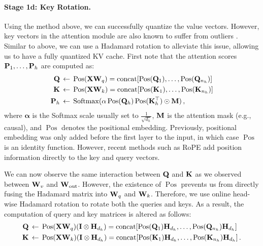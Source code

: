 \paragraph{Stage 1d: Key Rotation.}
Using the method above, we can successfully quantize the value vectors. However, key vectors in the attention module are also known to suffer from outliers \citep{kvquant, kivi}. Similar to above, we can use a Hadamard rotation to alleviate this issue, allowing us to have a fully quantized KV cache. First note that the attention scores ${\mathbf{P}}_1, \ldots, {\mathbf{P}}_h$ are computed as:
\begin{align}
    {\mathbf{Q}} &\,\leftarrow\, \operatorname{Pos}({\mathbf{X}}{\mathbf{W}}_q) = \textrm{concat}[\operatorname{Pos}({\mathbf{Q}}_1), \ldots, \operatorname{Pos}({\mathbf{Q}}_{n_h})] \\
    {\mathbf{K}} &\,\leftarrow\, \operatorname{Pos}({\mathbf{X}}{\mathbf{W}}_k) = \textrm{concat}[\operatorname{Pos}({\mathbf{K}}_1), \ldots, \operatorname{Pos}({\mathbf{K}}_{n_h})]\\
    {\mathbf{P}}_h & \,\leftarrow\, \operatorname{Softmax}(\alpha \operatorname{Pos}({\mathbf{Q}}_h) \operatorname{Pos}({\mathbf{K}}_h^\top) \odot {\mathbf{M}})   \, ,
\end{align}
where $\boldsymbol\alpha$ is the Softmax scale usually set to $\frac{1}{\sqrt{d_h}}$, ${\mathbf{M}}$ is the attention mask (e.g., causal), and $\operatorname{Pos}$ denotes the positional embedding. Previously, positional embedding was only added before the first layer to the input, in which case $\operatorname{Pos}$ is an identity function. However, recent methods such as RoPE \citep{rope} add position information directly to the key and query vectors.

We can now observe the same interaction between ${\mathbf{Q}}$ and ${\mathbf{K}}$ as we observed between ${\mathbf{W}}_v$ and ${\mathbf{W}}_{\text{out}}$. However, the existence of $\operatorname{Pos}$ prevents us from directly fusing the Hadamard matrix into ${\mathbf{W}}_q$ and ${\mathbf{W}}_k$. Therefore, we use online head-wise Hadamard rotation to rotate both the queries and keys. As a result, the computation of query and key matrices is altered as follows: 
\begin{align}
    {\mathbf{Q}} &\,\leftarrow\, \operatorname{Pos}({\mathbf{X}}{\mathbf{W}}_q)({\mathbf{I}} \otimes {\mathbf{H}}_{d_h}) = \textrm{concat}[\operatorname{Pos}({\mathbf{Q}}_1){\mathbf{H}}_{d_h}, \ldots, \operatorname{Pos}({\mathbf{Q}}_{n_h}){\mathbf{H}}_{d_h}] \\
    {\mathbf{K}} &\,\leftarrow\, \operatorname{Pos}({\mathbf{X}}{\mathbf{W}}_k)({\mathbf{I}} \otimes {\mathbf{H}}_{d_h}) = \textrm{concat}[\operatorname{Pos}({\mathbf{K}}_1){\mathbf{H}}_{d_h}, \ldots, \operatorname{Pos}({\mathbf{K}}_{n_h}) {\mathbf{H}}_{d_h}] \, .
\end{align}

